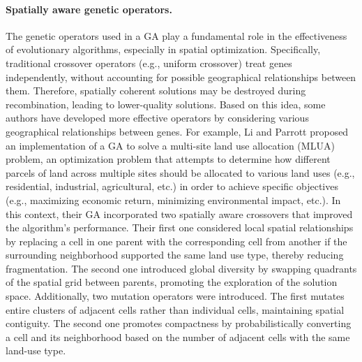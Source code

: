 \paragraph{Spatially aware genetic operators.}
The genetic operators used in a GA play a fundamental role in the effectiveness of evolutionary algorithms, especially in spatial optimization. Specifically, traditional crossover operators (e.g., uniform crossover) treat genes independently, without accounting for possible geographical relationships between them. Therefore, spatially coherent solutions may be destroyed during recombination, leading to lower-quality solutions. Based on this idea, some authors have developed more effective operators by considering various geographical relationships between genes. For example, Li and Parrott \cite{li2016improved} proposed an implementation of a GA to solve a multi-site land use allocation (MLUA) problem, an optimization problem that attempts to determine how different parcels of land across multiple sites should be allocated to various land uses (e.g., residential, industrial, agricultural, etc.) in order to achieve specific objectives (e.g., maximizing economic return, minimizing environmental impact, etc.). In this context, their GA incorporated two spatially aware crossovers that improved the algorithm's performance. Their first one considered local spatial relationships by replacing a cell in one parent with the corresponding cell from another if the surrounding neighborhood supported the same land use type, thereby reducing fragmentation. The second one introduced global diversity by swapping quadrants of the spatial grid between parents, promoting the exploration of the solution space.
Additionally, two mutation operators were introduced. The first mutates entire clusters of adjacent cells rather than individual cells, maintaining spatial contiguity. The second one promotes compactness by probabilistically converting a cell and its neighborhood based on the number of adjacent cells with the same land-use type.

